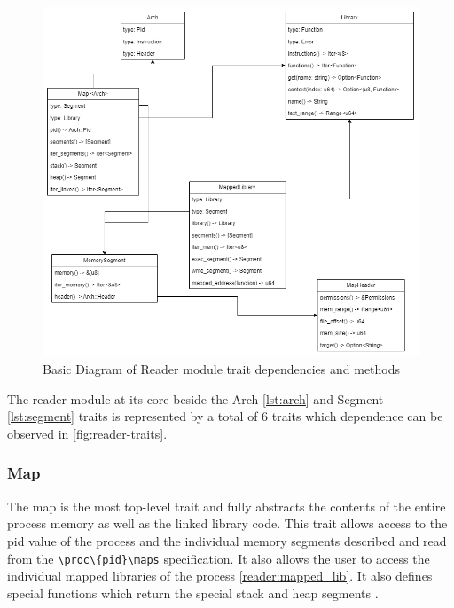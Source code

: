 \begin{figure}
    \centering
    \includegraphics[width=0.65\linewidth]{reader_traits.drawio.png}
    \caption{Basic Diagram of Reader module trait dependencies and methods}
    \label{fig:reader-traits}
\end{figure}

The reader module at its core beside the Arch \autoref{lst:arch} and Segment \autoref{lst:segment} traits is represented by a total of 6 traits which dependence can be observed in \autoref{fig:reader-traits}.

    \subsubsection{Map}
    \label{reader:map}

The map is the most top-level trait and fully abstracts the contents of the entire process memory as well as the linked library code.
This trait allows access to the pid value of the process and the individual memory segments described and read from the \verb|\proc\{pid}\maps| \cite{kerrisk_proc_pid_maps5_2024} specification.
It also allows the user to access the individual mapped libraries of the process \autoref{reader:mapped_lib}.
It also defines special functions which return the special stack and heap segments \cite{kerrisk_memory_2010}.
    
